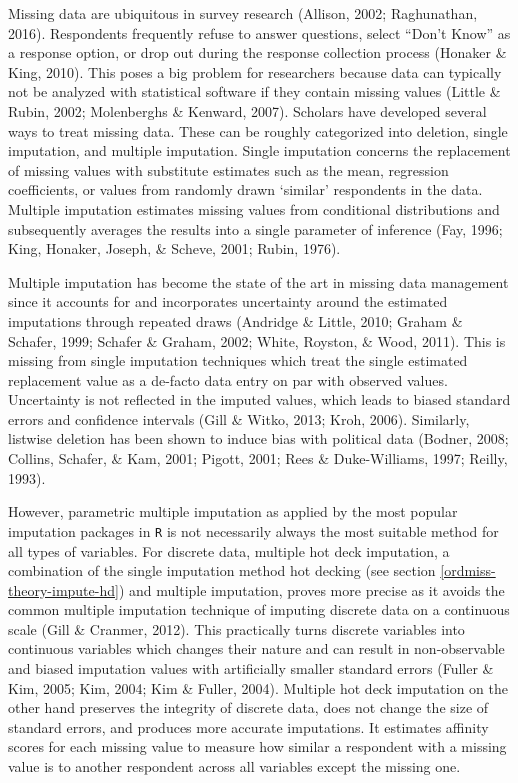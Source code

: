 \documentclass[12pt,econ]{sources/authesis}
\begin{document}
Missing data are ubiquitous in survey research (Allison, 2002; Raghunathan, 2016). Respondents frequently refuse to answer questions, select ``Don't Know'' as a response option, or drop out during the response collection process (Honaker \& King, 2010). This poses a big problem for researchers because data can typically not be analyzed with statistical software if they contain missing values (Little \& Rubin, 2002; Molenberghs \& Kenward, 2007). Scholars have developed several ways to treat missing data. These can be roughly categorized into deletion, single imputation, and multiple imputation. Single imputation concerns the replacement of missing values with substitute estimates such as the mean, regression coefficients, or values from randomly drawn `similar' respondents in the data. Multiple imputation estimates missing values from conditional distributions and subsequently averages the results into a single parameter of inference (Fay, 1996; King, Honaker, Joseph, \& Scheve, 2001; Rubin, 1976).

Multiple imputation has become the state of the art in missing data management since it accounts for and incorporates uncertainty around the estimated imputations through repeated draws (Andridge \& Little, 2010; Graham \& Schafer, 1999; Schafer \& Graham, 2002; White, Royston, \& Wood, 2011). This is missing from single imputation techniques which treat the single estimated replacement value as a de-facto data entry on par with observed values. Uncertainty is not reflected in the imputed values, which leads to biased standard errors and confidence intervals (Gill \& Witko, 2013; Kroh, 2006). Similarly, listwise deletion has been shown to induce bias with political data (Bodner, 2008; Collins, Schafer, \& Kam, 2001; Pigott, 2001; Rees \& Duke-Williams, 1997; Reilly, 1993).

However, parametric multiple imputation as applied by the most popular imputation packages in \texttt{R} is not necessarily always the most suitable method for all types of variables. For discrete data, multiple hot deck imputation, a combination of the single imputation method hot decking (see section \ref{ordmiss-theory-impute-hd}) and multiple imputation, proves more precise as it avoids the common multiple imputation technique of imputing discrete data on a continuous scale (Gill \& Cranmer, 2012). This practically turns discrete variables into continuous variables which changes their nature and can result in non-observable and biased imputation values with artificially smaller standard errors (Fuller \& Kim, 2005; Kim, 2004; Kim \& Fuller, 2004). Multiple hot deck imputation on the other hand preserves the integrity of discrete data, does not change the size of standard errors, and produces more accurate imputations. It estimates affinity scores for each missing value to measure how similar a respondent with a missing value is to another respondent across all variables except the missing one.
\end{document}
